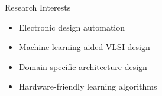 
\begin{rSection}{Research Interests}
\begin{itemize}
    \item Electronic design automation
    \item Machine learning-aided VLSI design
    \item Domain-specific architecture design
    \item Hardware-friendly learning algorithms
\end{itemize}
\end{rSection}

\iffalse
\begin{rSection}{Research Topics}
	\begin{itemize}
		\item Layout Optimization  \\%
		 - Propose a framework to combine layout decomposition and mask optimization into one stage.
		\item Standard Cell Synthesis   \\%
		 - Develop an algorithm of generating standard cell layouts of regular style.
		\item Adder Synthesis  \\%
		 - Propose a machine learning based methodology to search for best performance-area/power trade-off adders.
	\end{itemize}
\end{rSection}
\fi

